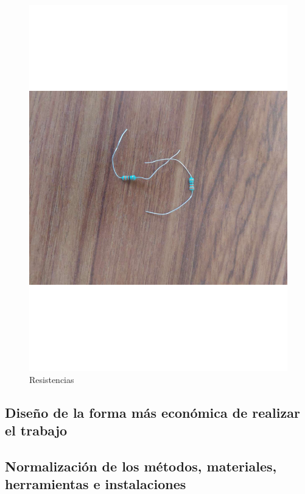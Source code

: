     \begin{figure}[H]
        \centering
        \includegraphics[trim = {30mm 30mm 30mm 30mm},clip,scale=0.2]{10/Img/resistencias.pdf}
        \caption{Resistencias}
        \label{Resistencias}
    \end{figure}
%
%

%
%
\subsection{Diseño de la forma más económica de realizar el trabajo}   

%    
%   
\subsection{Normalización de los métodos, materiales, herramientas e instalaciones}    

